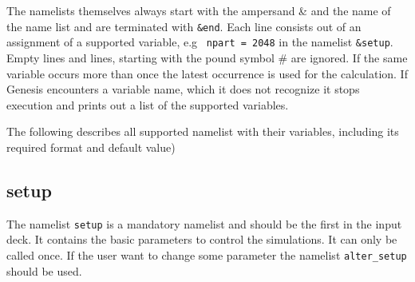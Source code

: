 \documentclass[12pt]{book}
\begin{document}
The namelists themselves always start with the ampersand \& and the name of the name list and are terminated with {\tt {\&}end}. 
Each line consists out of an assignment of a supported variable, e.g~ {\tt npart = 2048} in the namelist {\tt {\&}setup}.  Empty lines and lines, starting with the pound symbol \# are ignored. If the same variable occurs more than once the latest occurrence is used for the calculation. If Genesis encounters a variable name, which it does not recognize it stops execution and prints out a list of the supported variables. 

The following describes all supported namelist with their variables, including its required format and default value)

\subsection{\sf setup}

The namelist {\tt setup} is a mandatory namelist and should be the first in the input deck. It contains the basic parameters to control the simulations. It can only be called once. If the user want to change some parameter the namelist {\tt alter\_setup} should be used.
\end{document}
